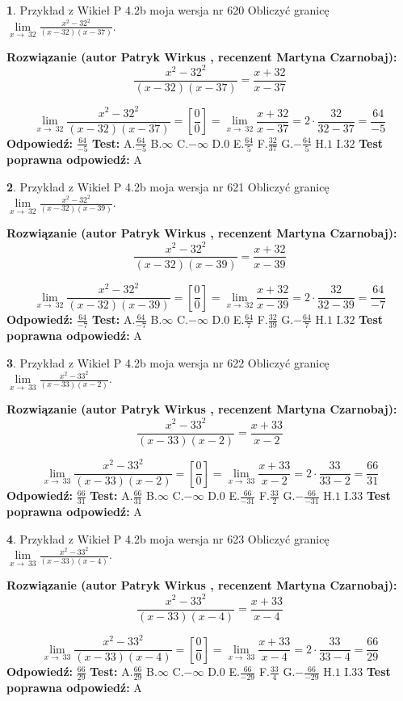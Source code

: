 \documentclass[12pt, a4paper]{article}
\theoremstyle{definition} %
\newtheorem{zad}{}
\newcommand{\zadStart}[1]{\begin{zad}#1\newline}
\newcommand{\zadStop}{\end{zad}}
\newcommand{\rozwStart}[2]{\noindent \textbf{Rozwiązanie (autor #1 , recenzent #2): }\newline}
\newcommand{\rozwStop}{\newline}
\newcommand{\odpStart}{\noindent \textbf{Odpowiedź:}\newline}
\newcommand{\odpStop}{\newline}
\newcommand{\testStart}{\noindent \textbf{Test:}\newline}
\newcommand{\testStop}{\newline}
\newcommand{\kluczStart}{\noindent \textbf{Test poprawna odpowiedź:}\newline}
\newcommand{\kluczStop}{\newline}
\begin{document}
\zadStart{Przykład z Wikieł P 4.2b moja wersja nr 620}
Obliczyć granicę $\lim\limits_{x\to\ 32}\frac{x^{2}-32^{2}}{(x-32)(x-37)}$.
\zadStop
\rozwStart{Patryk Wirkus}{Martyna Czarnobaj}
$$\frac{x^{2}-32^{2}}{(x-32)(x-37)}=\frac{x+32}{x-37}$$

$$\lim\limits_{x\to\ 32}\frac{x^{2}-32^{2}}{(x-32)(x-37)}=[\frac{0}{0}]=\lim\limits_{x\to\ 32}\frac{x+32}{x-37}=2 \cdot \frac{32}{32-37} = \frac{64}{-5}$$
\rozwStop
\odpStart
$\frac{64}{-5}$
\odpStop
\testStart
A.$\frac{64}{-5}$
B.$\infty$
C.$-\infty$
D.$0$
E.$\frac{64}{5}$
F.$\frac{32}{37}$
G.$-\frac{64}{5}$
H.$1$
I.$32$
\testStop
\kluczStart
A
\kluczStop



\zadStart{Przykład z Wikieł P 4.2b moja wersja nr 621}
Obliczyć granicę $\lim\limits_{x\to\ 32}\frac{x^{2}-32^{2}}{(x-32)(x-39)}$.
\zadStop
\rozwStart{Patryk Wirkus}{Martyna Czarnobaj}
$$\frac{x^{2}-32^{2}}{(x-32)(x-39)}=\frac{x+32}{x-39}$$

$$\lim\limits_{x\to\ 32}\frac{x^{2}-32^{2}}{(x-32)(x-39)}=[\frac{0}{0}]=\lim\limits_{x\to\ 32}\frac{x+32}{x-39}=2 \cdot \frac{32}{32-39} = \frac{64}{-7}$$
\rozwStop
\odpStart
$\frac{64}{-7}$
\odpStop
\testStart
A.$\frac{64}{-7}$
B.$\infty$
C.$-\infty$
D.$0$
E.$\frac{64}{7}$
F.$\frac{32}{39}$
G.$-\frac{64}{7}$
H.$1$
I.$32$
\testStop
\kluczStart
A
\kluczStop



\zadStart{Przykład z Wikieł P 4.2b moja wersja nr 622}
Obliczyć granicę $\lim\limits_{x\to\ 33}\frac{x^{2}-33^{2}}{(x-33)(x-2)}$.
\zadStop
\rozwStart{Patryk Wirkus}{Martyna Czarnobaj}
$$\frac{x^{2}-33^{2}}{(x-33)(x-2)}=\frac{x+33}{x-2}$$

$$\lim\limits_{x\to\ 33}\frac{x^{2}-33^{2}}{(x-33)(x-2)}=[\frac{0}{0}]=\lim\limits_{x\to\ 33}\frac{x+33}{x-2}=2 \cdot \frac{33}{33-2} = \frac{66}{31}$$
\rozwStop
\odpStart
$\frac{66}{31}$
\odpStop
\testStart
A.$\frac{66}{31}$
B.$\infty$
C.$-\infty$
D.$0$
E.$\frac{66}{-31}$
F.$\frac{33}{2}$
G.$-\frac{66}{-31}$
H.$1$
I.$33$
\testStop
\kluczStart
A
\kluczStop



\zadStart{Przykład z Wikieł P 4.2b moja wersja nr 623}
Obliczyć granicę $\lim\limits_{x\to\ 33}\frac{x^{2}-33^{2}}{(x-33)(x-4)}$.
\zadStop
\rozwStart{Patryk Wirkus}{Martyna Czarnobaj}
$$\frac{x^{2}-33^{2}}{(x-33)(x-4)}=\frac{x+33}{x-4}$$

$$\lim\limits_{x\to\ 33}\frac{x^{2}-33^{2}}{(x-33)(x-4)}=[\frac{0}{0}]=\lim\limits_{x\to\ 33}\frac{x+33}{x-4}=2 \cdot \frac{33}{33-4} = \frac{66}{29}$$
\rozwStop
\odpStart
$\frac{66}{29}$
\odpStop
\testStart
A.$\frac{66}{29}$
B.$\infty$
C.$-\infty$
D.$0$
E.$\frac{66}{-29}$
F.$\frac{33}{4}$
G.$-\frac{66}{-29}$
H.$1$
I.$33$
\testStop
\kluczStart
A
\kluczStop
\end{document}
